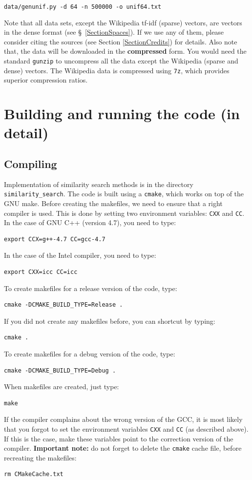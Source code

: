 \documentclass[runningheads,a4paper]{llncs}
\newcommand{\ttt}[1]{\texttt{#1}}
\begin{document}
{\begin{itemize}
\ttt{data/genunif.py -d 64 -n 500000 -o unif64.txt}
\end{itemize}

Note that all data sets, except the Wikipedia tf-idf (sparse) vectors, 
are vectors in the dense format (see \S~\ref{SectionSpaces}).
If we use any of them, please consider citing the sources (see Section \ref{SectionCredits}) for details.
Also note that, the data will be downloaded in the \textbf{compressed} form.
You would need the standard \ttt{gunzip} to uncompress all the data except
the Wikipedia (sparse and dense) vectors.
The Wikipedia data is compressed using \ttt{7z}, which provides 
superior compression ratios.

\section{Building and running the code (in detail)}\label{SectionBuild}
\subsection{Compiling}
Implementation of similarity search methods is in the directory \ttt{similarity\_search}.
The code is built using a \ttt{cmake}, which works on top of the GNU make.
Before creating the makefiles, we need to ensure that a right compiler is used.
This is done by setting two environment variables: \ttt{CXX} and \ttt{CC}.
In the case of GNU C++ (version 4.7), you need to type:
\begin{verbatim}
export CCX=g++-4.7 CC=gcc-4.7 
\end{verbatim}
In the case of the Intel compiler, you need to type:
\begin{verbatim}
export CXX=icc CC=icc 
\end{verbatim}


To create makefiles for a release version of the code, type:
\begin{verbatim}
cmake -DCMAKE_BUILD_TYPE=Release .
\end{verbatim}
If you did not create any makefiles before, you can shortcut by typing:
\begin{verbatim}
cmake . 
\end{verbatim}
To create makefiles for a debug version of the code, type:
\begin{verbatim}
cmake -DCMAKE_BUILD_TYPE=Debug .
\end{verbatim}
When makefiles are created, just type:
\begin{verbatim}
make
\end{verbatim}
If the compiler complains about the wrong version of the GCC, 
it is most likely that you forgot to set the environment variables \ttt{CXX} and \ttt{CC} (as described above).
If this is the case, make these variables point to the correction version of the compiler.
\textbf{Important note:} 
do not forget to delete the \ttt{cmake} cache file, before recreating the makefiles:
\begin{verbatim}
rm CMakeCache.txt
\end{verbatim}

}
\end{document}

